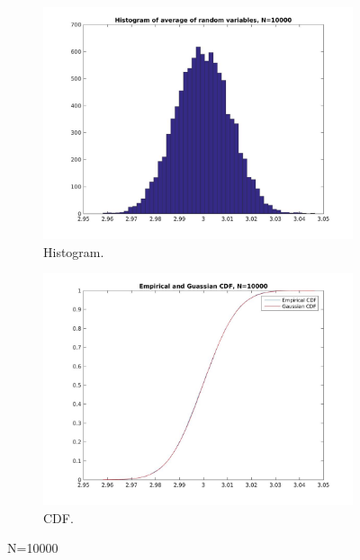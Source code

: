\documentclass[12pt]{article}
\begin{document}
\begin{figure}[h!]
  \centering
  \begin{subfigure}[b]{0.4\linewidth}
    \includegraphics[width=\linewidth]{jpgs/histograms/10000_hist.jpg}
    \caption{Histogram.}
  \end{subfigure}
  \begin{subfigure}[b]{0.4\linewidth}
    \includegraphics[width=\linewidth]{jpgs/cdfs/10000_cdf.jpg}
    \caption{CDF.}
  \end{subfigure}
  \caption{N=10000}
\end{figure}
\end{document}
